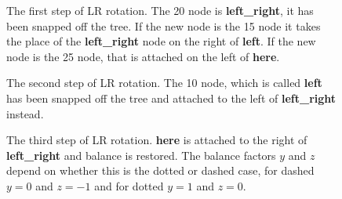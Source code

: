 \documentclass[11pt,a4paper]{scrartcl}
\begin{document}
\begin{figure}
\begin{center}
\end{center}
\caption{The first step of LR rotation. The 20 node is {\bf
    left\_right}, it has been snapped off the tree. If the new node is
  the 15 node it takes the place of the {\bf left\_right} node on the
  right of {\bf left}.  If the new node is the 25 node, that is
  attached on the left of {\bf here}.\label{fig_LR_1}}
\end{figure}


\begin{figure}
\begin{center}
\end{center}
\caption{The second step of LR rotation. The 10 node, which is called {\bf left} has been snapped off the tree and attached to the left of {\bf left\_right} instead. \label{fig_LR_2}}
\end{figure}


\begin{figure}
\begin{center}
\end{center}
\caption{The third step of LR rotation. {\bf here} is attached to the
  right of {\bf left\_right} and balance is restored. The balance
  factors $y$ and $z$ depend on whether this is the dotted or dashed
  case, for dashed $y=0$ and $z=-1$ and for dotted $y=1$ and
  $z=0$.\label{fig_LR_3}}
\end{figure}
\end{document}
